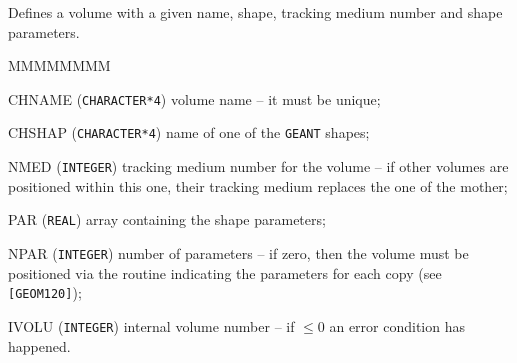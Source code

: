    
   
 
Defines a volume with a given name, shape, tracking medium number
and shape parameters.

\begin{DLtt}{MMMMMMMM}
\item[CHNAME]  ({\tt CHARACTER*4}) volume name -- it must be unique;
\item[CHSHAP] ({\tt CHARACTER*4}) name of one of the {\tt GEANT} shapes;
\item[NMED]  ({\tt INTEGER}) tracking medium number for the volume --
if other volumes are positioned within this one, their tracking medium
replaces the one of the mother;
\item[PAR]   ({\tt REAL}) array containing the shape parameters;
\item[NPAR]  ({\tt INTEGER}) number of parameters -- if zero, then the
volume must be positioned via the routine  indicating
the parameters for each copy (see {\tt [GEOM120]});
\item[IVOLU] ({\tt INTEGER}) internal volume number -- if $\leq 0$
an error condition has happened.
\end{DLtt}
 
